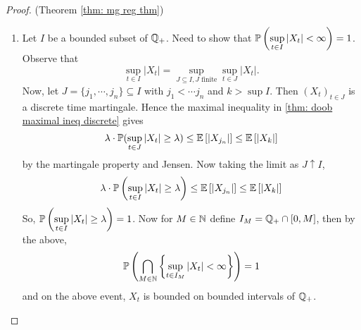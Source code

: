 \documentclass{article}
\begin{document}
\begin{proof}{(Theorem \ref{thm: mg reg thm})}
   \begin{enumerate}
	   \item Let $ I$ be a bounded subset of $ \mathbb{Q}_{+}$. Need to show that $ \mathbb{P}\left(\displaystyle\sup_{t\in I}|X_{t}|<\infty\right)=1$. Observe that 
		   \[
		   \displaystyle\sup_{t\in I}|X_{t}| = \displaystyle\sup_{J \subseteq I, J \text{ finite}}\displaystyle\sup_{t\in J}|X_{t}|.
		   \]
		   Now, let $ J = \{j_{1}, \cdots, j_{n}\}\subseteq I$ with $ j_{1}<\cdots j_{n}$ and $ k>\displaystyle\sup I$. Then $ (X_{t})_{t\in J}$ is a discrete time martingale. Hence the maximal inequality in \ref{thm: doob maximal ineq discrete} gives
		   \[
		   \lambda \cdot \mathbb{P}(\displaystyle\sup_{t\in J}|X_{t}|\geq \lambda)\leq \mathbb{E}\left[ |X_{j_{n}}| \right]\leq \mathbb{E}\left[ |X_{k}| \right]
		   \]	
		    by the martingale property and Jensen. Now taking the limit as $ J\uparrow I$, 
	\[
	 \lambda \cdot \mathbb{P}\left(\displaystyle\sup_{t\in I}|X_{t}|\geq \lambda\right)\leq \mathbb{E}\left[ |X_{j_{n}}| \right]\leq \mathbb{E}\left[ |X_{k}| \right]
	\]
	So, $ \mathbb{P} \left(\displaystyle\sup_{t\in I}|X_{t}|\geq \lambda \right) = 1$. Now for $ M\in \mathbb{N}$ define $ I_{M} = \mathbb{Q}_{+}\cap [0,M]$, then by the above, 
	\[
	\mathbb{P} \left( \displaystyle\bigcap_{M\in \mathbb{N}} \left\{ \displaystyle\sup_{t\in I_{M}}|X_{t}|<\infty \right\} \right) = 1
	\]
	and on the above event, $ X_{t}$  is bounded on bounded intervals of $ \mathbb{Q}_{+}$.


\end{enumerate}
\end{proof}
\end{document}
